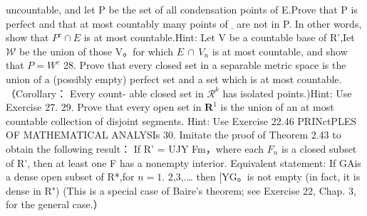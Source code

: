 uncountable, and let P be the set of all condensation points of E.Prove that P is perfect and that at most countably many points of $\underline{{\mathbf{}}}$ are not in P. In other words, show that $P^{c}\cap E$ is at most countable.Hint: Let {V} be a countable base of R',Iet ${\mathcal{W}}$ be the union of those V。for which $E\,\cap\,V_{n}$ is at most countable, and show that $P=W^{c}$ 28. Prove that every closed set in a separable metric space is the union of a (possibly empty) perfect set and a set which is at most countable.（Corollary： Every count- able closed set in $\textstyle{\mathcal{R}}^{k}$ has isolated points.)Hint: Use Exercise 27. 29. Prove that every open set in ${\boldsymbol{R}}^{1}$ is the union of an at most countable collection of disjoint segments. Hint: Use Exercise 22.46 PRINctPLES OF MATHEMATICAL ANALYSIs 30. Imitate the proof of Theorem 2.43 to obtain the following result： If R' = UJY Fm，where each $F_{n}$ is a closed subset of R', then at least one F has a nonempty interior. Equivalent statement: If GAis a dense open subset of R*,for $\scriptstyle n=1.$ 2,3,.… then [YG。is not empty (in fact, it is dense in R") (This is a special case of Baire's theorem; see Exercise 22, Chap. 3, for the general case.）